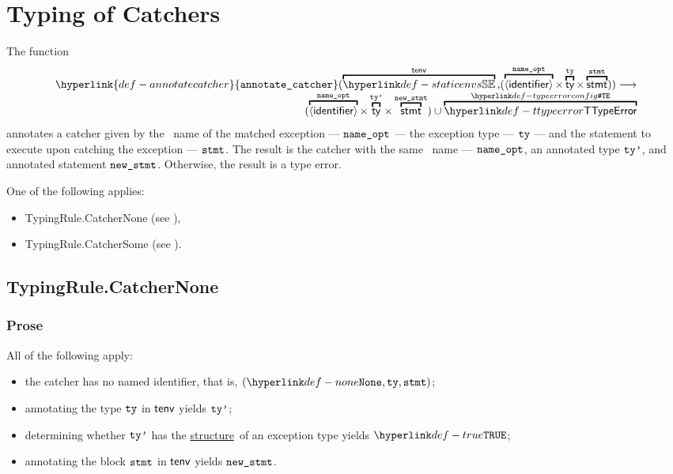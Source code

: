 \documentclass{book}
\newcommand\ProseOrTypeError[0]{\ProseTerminateAs{\TypeErrorConfig}}
\newcommand\structure[0]{\hyperlink{def-structure}{structure}}
\newcommand\annotatecatcher[1]{\hyperlink{def-annotatecatcher}{\texttt{annotate\_catcher}}(#1)}
\begin{document}
\chapter{Typing of Catchers}
\hypertarget{def-annotatecatcher}{}
The function
\[
\begin{array}{r}
  \annotatecatcher{
    \overname{\staticenvs}{\tenv} \aslsep
    (\overname{\langle\identifier\rangle}{\nameopt} \times \overname{\ty}{\tty} \times \overname{\stmt}{\vstmt})
  } \aslto \\
  (\overname{\langle\identifier\rangle}{\nameopt} \times \overname{\ty}{\ttyp} \times \overname{\stmt}{\newstmt})
  \cup \overname{\TTypeError}{\TypeErrorConfig}
\end{array}
\]
annotates a catcher given by the \optional\ name of the matched exception --- $\texttt{name\_opt}$ ---
the exception type --- $\texttt{ty}$ --- and the statement to execute upon catching the exception --- $\texttt{stmt}$.
The result is the catcher with the same \optional\ name --- $\texttt{name\_opt}$, an annotated type $\texttt{ty'}$, and annotated statement $\texttt{new\_stmt}$.
Otherwise, the result is a type error.

One of the following applies:
\begin{itemize}
\item TypingRule.CatcherNone (see ),
\item TypingRule.CatcherSome (see ).
\end{itemize}

\section{TypingRule.CatcherNone \label{sec:TypingRule.CatcherNone}}

\subsection{Prose}
All of the following apply:
\begin{itemize}
  \item the catcher has no named identifier, that is, $(\None, \tty, \vstmt)$;
  \item annotating the type $\texttt{ty}$ in $\textsf{tenv}$ yields $\texttt{ty'}$\ProseOrTypeError;
  \item determining whether $\texttt{ty'}$ has the \structure\ of an exception type yields $\True$\ProseOrTypeError;
  \item annotating the block $\texttt{stmt}$ in $\textsf{tenv}$ yields $\texttt{new\_stmt}$.
\end{itemize}
\end{document}
